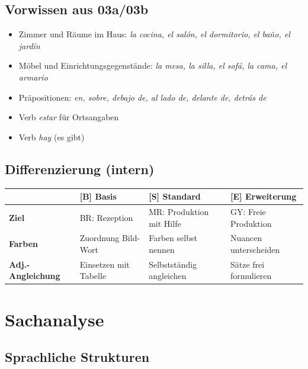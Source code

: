 \documentclass[11pt,a4paper]{article}
\newcommand{\B}{\textcolor{basis}{\textbf{[B]}}}
\newcommand{\Std}{\textcolor{standard}{\textbf{[S]}}}
\newcommand{\E}{\textcolor{erweiterung}{\textbf{[E]}}}
\begin{document}
\subsection{Vorwissen aus 03a/03b}
\begin{itemize}
    \item Zimmer und Räume im Haus: \textit{la cocina, el salón, el dormitorio, el baño, el jardín}
    \item Möbel und Einrichtungsgegenstände: \textit{la mesa, la silla, el sofá, la cama, el armario}
    \item Präpositionen: \textit{en, sobre, debajo de, al lado de, delante de, detrás de}
    \item Verb \textit{estar} für Ortsangaben
    \item Verb \textit{hay} (es gibt)
\end{itemize}

\subsection{Differenzierung (intern)}
\begin{tabular}{|l|p{3.5cm}|p{3.5cm}|p{3.5cm}|}
\hline
& \B{} \textbf{Basis} & \Std{} \textbf{Standard} & \E{} \textbf{Erweiterung} \\
\hline
\textbf{Ziel} & BR: Rezeption & MR: Produktion mit Hilfe & GY: Freie Produktion \\
\hline
\textbf{Farben} & Zuordnung Bild-Wort & Farben selbst nennen & Nuancen unterscheiden \\
\hline
\textbf{Adj.-Angleichung} & Einsetzen mit Tabelle & Selbstständig angleichen & Sätze frei formulieren \\
\hline
\end{tabular}

\section{Sachanalyse}

\subsection{Sprachliche Strukturen}
\end{document}
